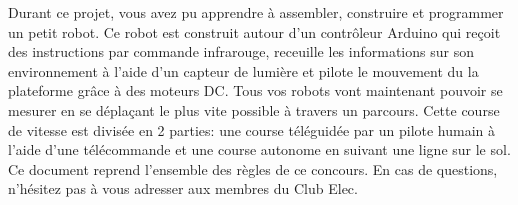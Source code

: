 Durant ce projet, vous avez pu apprendre à assembler, construire et programmer un petit robot. Ce robot est construit autour d'un contrôleur Arduino qui reçoit des instructions par commande infrarouge, receuille les informations sur son environnement à l'aide d'un capteur de lumière et pilote le mouvement du la plateforme grâce à des moteurs DC. Tous vos robots vont maintenant pouvoir se mesurer en se déplaçant le plus vite possible à travers un parcours. Cette course de vitesse est divisée en 2 parties: une course téléguidée par un pilote humain à l'aide d'une télécommande et une course autonome en suivant une ligne sur le sol. Ce document reprend l'ensemble des règles de ce concours. En cas de questions, n'hésitez pas à vous adresser aux membres du Club Elec.
